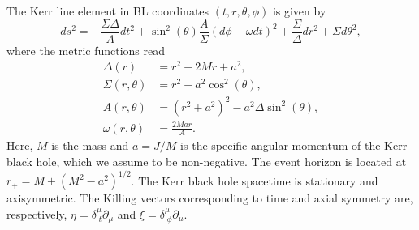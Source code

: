 \documentclass[a4paper,fleqn,usenatbib]{mnrasMOD}
\numberwithin{equation}{section}
\newcommand{\be}{\begin{equation}}
\newcommand{\ee}{\end{equation}}
\def\p{\partial}
\begin{document}
The Kerr line element \cite{Bardeen:1972fi} in BL coordinates $(t, r, \theta, \phi)$ is given by
\be \label{Kerr}
ds^2 =-\frac{\Sigma \Delta}{A} dt^2 + \sin^2(\theta) \frac{A}{\Sigma}(d\phi - \omega dt)^2 + \frac{\Sigma}{\Delta}dr^2 + \Sigma d\theta^2,
\ee
where the metric functions read
\begin{subequations}
\begin{align}
\Delta(r) &= r^2-2Mr +a^2, \\
\Sigma(r,\theta) &= r^2+a^2\cos^2(\theta),\\
A(r, \theta) &= (r^2+a^2)^2-a^2\Delta\sin^2(\theta),\\
\omega(r, \theta) &= \frac{2 M a r }{A}.
\end{align}
\end{subequations}
Here, $M$ is the mass and $a = J/M$ is the specific angular momentum of the Kerr black hole, which we assume to be non-negative. The event horizon is located at $r_{+} = M + (M^2 - a^{2})^{1/2}$. The Kerr black hole spacetime is stationary and axisymmetric. The Killing vectors corresponding to time and axial symmetry are, respectively, $\eta = \delta^{\mu}_{\; t} \p_{\mu}$ and $\xi = \delta^{\mu}_{\; \phi} \p_{\mu}$.
\end{document}

